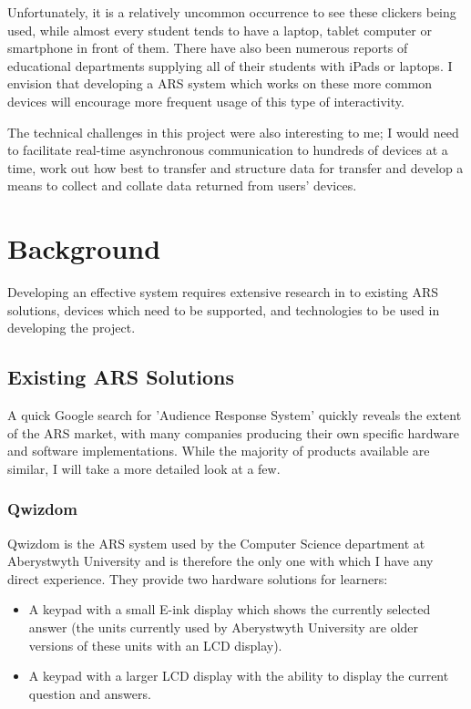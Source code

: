 \documentclass[a4papert,11pt,notitlepage]{ltxdoc}
\begin{document}
Unfortunately, it is a relatively uncommon occurrence to see these clickers being used, while almost every student tends to have a laptop, tablet computer or smartphone in front of them. There have also been numerous reports of educational departments supplying all of their students with iPads or laptops. I envision that developing a ARS system which works on these more common devices will encourage more frequent usage of this type of interactivity.

The technical challenges in this project were also interesting to me; I would need to facilitate real-time asynchronous communication to hundreds of devices at a time, work out how best to transfer and structure data for transfer and develop a means to collect and collate data returned from users' devices.

\section{Background}
Developing an effective system requires extensive research in to existing ARS solutions, devices which need to be supported, and technologies to be used in developing the project.

\subsection{Existing ARS Solutions}
A quick Google search for 'Audience Response System' quickly reveals the extent of the ARS market, with many companies producing their own specific hardware and software implementations. While the majority of products available are similar, I will take a more detailed look at a few.

\subsubsection{Qwizdom}
Qwizdom is the ARS system used by the Computer Science department at Aberystwyth University and is therefore the only one with which I have any direct experience. They provide two hardware solutions for learners:
\begin{itemize}
\item A keypad with a small E-ink display which shows the currently selected answer (the units currently used by Aberystwyth University are older versions of these units with an LCD display).
\item A keypad with a larger LCD display with the ability to display the current question and answers.
\end{itemize}
\end{document}
